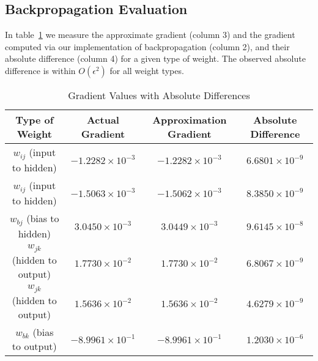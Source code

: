 \subsection{Backpropagation Evaluation}
In table~\ref{tab:gradient_table} we measure the approximate gradient (column 3)
and the gradient computed via our implementation of backpropagation (column 2),
and their absolute difference (column 4) for a given type of weight. The
observed absolute difference is within $O( \epsilon^2 )$ for all
weight types.
\begin{table}[H]
	\renewcommand{\arraystretch}{1.25}
	\centering
	\begin{tabular}{|c|c|c|c|}
		\hline
		Type of Weight              & Actual Gradient          & Approximation Gradient   & Absolute Difference     \\
		\hline
		$w_{ij}$ (input to hidden)  & $-1.2282 \times 10^{-3}$ & $-1.2282 \times 10^{-3}$ & $6.6801 \times 10^{-9}$ \\
		$w_{ij}$ (input to hidden)  & $-1.5063 \times 10^{-3}$ & $-1.5062 \times 10^{-3}$ & $8.3850 \times 10^{-9}$ \\
		$w_{bj}$ (bias to hidden)   & $3.0450 \times 10^{-3}$  & $3.0449 \times 10^{-3}$  & $9.6145 \times 10^{-8}$ \\
		$w_{jk}$ (hidden to output) & $1.7730 \times 10^{-2}$  & $1.7730 \times 10^{-2}$  & $6.8067 \times 10^{-9}$ \\
		$w_{jk}$ (hidden to output) & $1.5636 \times 10^{-2}$  & $1.5636 \times 10^{-2}$  & $4.6279 \times 10^{-9}$ \\
		$w_{bk}$ (bias to output)   & $-8.9961 \times 10^{-1}$ & $-8.9961 \times 10^{-1}$ & $1.2030 \times 10^{-6}$ \\
		\hline
	\end{tabular}
	\vspace{0.25cm}
	\caption{Gradient Values with Absolute Differences}
	\label{tab:gradient_table}
\end{table}

